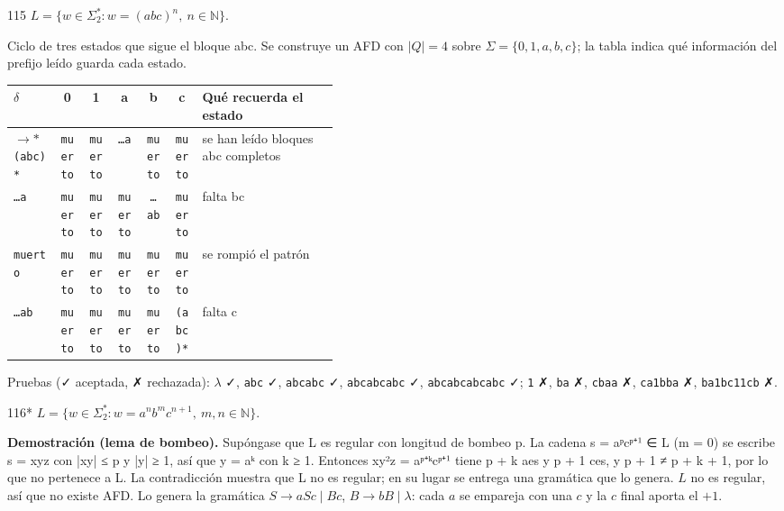 \documentclass[11pt]{article}
\begin{document}
\begin{ejercicio}{115}{}
$L = \{w \in \Sigma_2^* : w = (abc)^n,\ n \in \mathbb{N}\}$.
\end{ejercicio}
\proc Ciclo de tres estados que sigue el bloque abc. Se construye un AFD con $|Q| = 4$ sobre $\Sigma = \{0, 1, a, b, c\}$; la tabla indica qué información del prefijo leído guarda cada estado.
\begin{center}\small\begin{tabular}{lcccccp{0.42\linewidth}}\toprule
$\delta$ & 0 & 1 & a & b & c & Qué recuerda el estado \\\midrule
$\to$$*$ \texttt{(abc)*} & \texttt{muerto} & \texttt{muerto} & \texttt{…a} & \texttt{muerto} & \texttt{muerto} & se han leído bloques abc completos \\
 \texttt{…a} & \texttt{muerto} & \texttt{muerto} & \texttt{muerto} & \texttt{…ab} & \texttt{muerto} & falta bc \\
 \texttt{muerto} & \texttt{muerto} & \texttt{muerto} & \texttt{muerto} & \texttt{muerto} & \texttt{muerto} & se rompió el patrón \\
 \texttt{…ab} & \texttt{muerto} & \texttt{muerto} & \texttt{muerto} & \texttt{muerto} & \texttt{(abc)*} & falta c \\
\bottomrule\end{tabular}\end{center}
Pruebas (✓ aceptada, ✗ rechazada): $\lambda$ ✓, \texttt{abc} ✓, \texttt{abcabc} ✓, \texttt{abcabcabc} ✓, \texttt{abcabcabcabc} ✓; \texttt{1} ✗, \texttt{ba} ✗, \texttt{cbaa} ✗, \texttt{ca1bba} ✗, \texttt{ba1bc11cb} ✗.



\begin{ejercicio}{116}{*}
$L = \{w \in \Sigma_2^* : w = a^n b^m c^{n+1},\ m, n \in \mathbb{N}\}$.
\end{ejercicio}
\proc \textbf{Demostración (lema de bombeo).} Supóngase que L es regular con longitud de bombeo p. La cadena s = aᵖcᵖ⁺¹ ∈ L (m = 0) se escribe s = xyz con |xy| ≤ p y |y| ≥ 1, así que y = aᵏ con k ≥ 1. Entonces xy²z = aᵖ⁺ᵏcᵖ⁺¹ tiene p + k aes y p + 1 ces, y p + 1 ≠ p + k + 1, por lo que no pertenece a L. La contradicción muestra que L no es regular; en su lugar se entrega una gramática que lo genera.
\resp $L$ no es regular, así que no existe AFD. Lo genera la gramática $S \to aSc \mid Bc$, $B \to bB \mid \lambda$: cada $a$ se empareja con una $c$ y la $c$ final aporta el $+1$.
\end{document}
